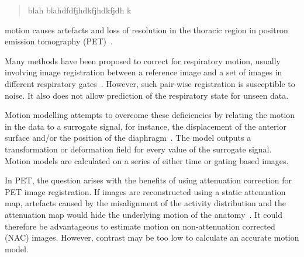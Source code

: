 \documentclass[9pt]{IEEEtran}
\begin{document}
\begin{@twocolumnfalse}
    \maketitle
    \begin{abstract}
      blah blahdfdfjhdkfjhdkfjdh k
    \end{abstract}
  \end{@twocolumnfalse}

 motion causes artefacts and loss of resolution in the thoracic region in positron emission tomography (PET)~\cite{Nehmeh2008}. %

Many methods have been proposed to correct for respiratory motion, usually involving image registration between a reference image and a set of images in different respiratory gates~\cite{Oliveira2014}. However, such pair-wise registration is susceptible to noise. It also does not allow prediction of the respiratory state for unseen data.

Motion modelling attempts to overcome these deficiencies by relating the motion in the data to a surrogate signal, for instance, the displacement of the anterior surface and/or the position of the diaphragm~\cite{McClelland2013}.
The model outputs a transformation or deformation field for every value of the surrogate signal. Motion models are calculated on a series of either time or gating based images.

In PET, the question arises with the benefits of using attenuation correction for PET image registration. If images are reconstructed using a static attenuation map,  artefacts caused by the misalignment of the activity distribution and the attenuation map would hide the underlying motion of the anatomy~\cite{Bousse2016}. It could therefore be advantageous to estimate motion on non-attenuation corrected (NAC) images. However, contrast may be too low to calculate an accurate motion model. 

\end{document}
